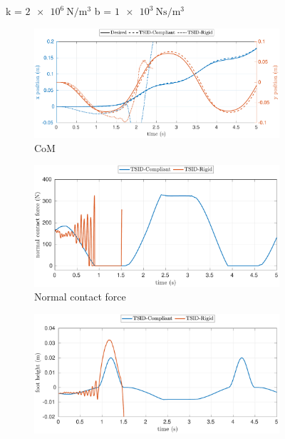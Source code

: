 \begin{figure}[t]
    \begin{myframe}{k = $\SI{2e6}{\newton \per \meter^3}$  b = $\SI{1e3}{\newton \second \per \meter^3}$}
    \centering
        \begin{subfigure}[b]{0.49\textwidth}
        \centering
        \includegraphics[height=0.151\textheight]{chapter_compliant_contact/figures/compliant_2e6_1e3_stiff_2e6_1e3_2_com.pdf}
        \caption{CoM}
        \label{fig:2e6_1e3_com}
    \end{subfigure}
    \hfill
    \begin{subfigure}[b]{0.49\textwidth}
        \centering
        \includegraphics[height=0.151\textheight]{chapter_compliant_contact/figures/compliant_2e6_1e3_stiff_2e6_1e3_2_force.pdf}
        \caption{Normal contact force}
        \label{fig:2e6_1e3_force}
    \end{subfigure}
     \begin{subfigure}[b]{0.49\textwidth}
        \centering
        \includegraphics[height=0.151\textheight]{chapter_compliant_contact/figures/compliant_2e6_1e3_stiff_2e6_1e3_2_foot.pdf}

\end{subfigure}
\end{myframe}
\end{figure}
